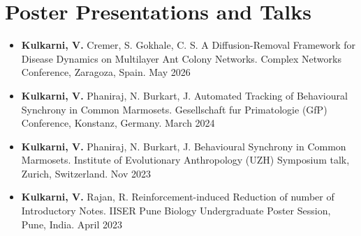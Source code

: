 \section{Poster Presentations and Talks}

\begin{itemize}
    \item \textbf{Kulkarni, V.} {Cremer, S. Gokhale, C. S. A Diffusion-Removal Framework for Disease Dynamics on Multilayer Ant Colony Networks. Complex Networks Conference, Zaragoza, Spain. May 2026}
    \item \textbf{Kulkarni, V.} {Phaniraj, N. Burkart, J. Automated Tracking of Behavioural Synchrony in Common Marmosets. Gesellschaft fur Primatologie (GfP) Conference, Konstanz, Germany. March 2024}
    \item \textbf{Kulkarni, V.} {Phaniraj, N. Burkart, J. Behavioural Synchrony in Common Marmosets. Institute of Evolutionary Anthropology (UZH) Symposium talk, Zurich, Switzerland. Nov 2023}
    \item \textbf{Kulkarni, V.} {Rajan, R. Reinforcement-induced Reduction of number of Introductory Notes. IISER Pune Biology Undergraduate Poster Session, Pune, India. April 2023}
\end{itemize}
